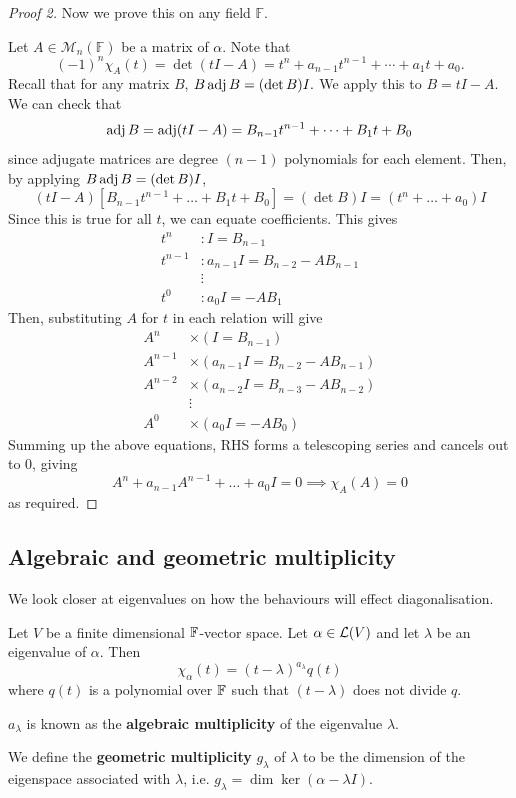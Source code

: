 \documentclass[a4paper,11pt]{article}
\begin{document}
\begin{proof}[Proof 2]
	Now we prove this on any field $\mathbb{F}$. 

	Let $ A\in \mathcal{M}_n(\mathbb{F}) $ be a matrix of $\alpha$. Note that 
	\[
		(-1)^n \chi_A(t) = \det (t I - A) = t^n + a_{n-1} t^{n-1} + \cdots + a_1 t + a_0.
 	\]
	Recall that for any matrix $B$, $ B \operatorname{adj} B = (\det B) I. $ We apply this to $B = t I - A$. We can check that
	\[
		\operatorname{adj} B = \operatorname{adj}(tI - A) = B_{n-1} t^{n-1} + \dots + B_1 t + B_0
	\]
	since adjugate matrices are degree $ (n-1) $ polynomials for each element.
	Then, by applying $ B \operatorname{adj} B = (\det B) I $,
	\[
		(tI - A) [ B_{n-1} t^{n-1} + \dots + B_1 t + B_0 ] = (\det B) I = (t^n + \dots + a_0) I
	\]
	Since this is true for all $ t $, we can equate coefficients.
	This gives
	\begin{align*}
		t^n     & :       I          = B_{n-1}            \\
		t^{n-1} & :       a_{n-1} I  = B_{n-2} - AB_{n-1} \\
		        & \vdots                           \\
		t^0     & :       a_0 I      = -A B_1
	\end{align*}
	Then, substituting $ A $ for $ t $ in each relation will give
	\begin{align*}
		A^n & \times (I = B_{n-1}) \\ 
		A^{n-1} & \times (a_{n-1} I = B _{n-2} - AB_{n-1}) \\ 
		A^{n-2} & \times (a_{n-2} I = B_{n-3} - AB_{n-2})\\
		& \vdots \\ 
		A^{0} & \times (a_0 I = - AB_0)
	\end{align*}
	Summing up the above equations, RHS forms a telescoping series and cancels out to $0$, giving
	\[
		A^n + a_{n-1} A^{n-1} + \dots + a_0 I = 0 \implies \chi_A(A) = 0
	\]
	as required. 
\end{proof}

\subsection{Algebraic and geometric multiplicity}
We look closer at eigenvalues on how the behaviours will effect diagonalisation. 
\begin{definition}
	Let $ V $ be a finite dimensional $ {\mathbb{F}} $-vector space.
	Let $ \alpha \in {\mathcal{L}}(V) $ and let $ \lambda $ be an eigenvalue of $ \alpha $.
	Then
	\[
		\chi_\alpha(t) = (t-\lambda)^{a_\lambda} q(t)
	\]
	where $ q(t) $ is a polynomial over $ {\mathbb{F}} $ such that $ (t-\lambda) $ does not divide $ q $.

	$ a_\lambda $ is known as the \textbf{algebraic multiplicity} of the eigenvalue $ \lambda $.
	
	We define the \textbf{geometric multiplicity} $ g_\lambda $ of $ \lambda $ to be the dimension of the eigenspace associated with $ \lambda $, i.e. $ g_\lambda = \dim \ker (\alpha - \lambda I) $.
\end{definition}
\end{document}
